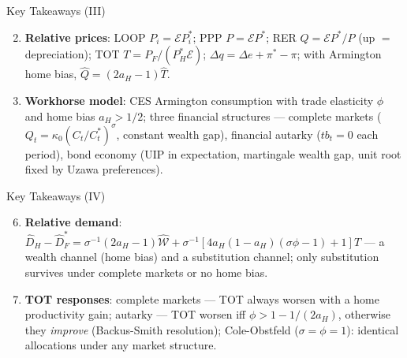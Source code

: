 \documentclass[blue]{beamer}
\begin{document}
\begin{frame}{Key Takeaways (III) }
\begin{enumerate}
    \setcounter{enumi}{1}
    \item \textbf{Relative prices}: LOOP $P_i = \mathcal{E}P_i^*$; PPP $P = \mathcal{E}P^*$; RER $Q = \mathcal{E}P^*/P$ (up $=$ depreciation); TOT $T = P_F/(P_H^*\mathcal{E})$; $\Delta q = \Delta e + \pi^* - \pi$; with Armington home bias, $\hat{Q} = (2a_H - 1)\hat{T}$.

    \item \textbf{Workhorse model}: CES Armington consumption with trade elasticity $\phi$ and home bias $a_H > 1/2$; three financial structures --- complete markets ($Q_t = \kappa_0(C_t/C_t^*)^{\sigma}$, constant wealth gap), financial autarky ($tb_t = 0$ each period), bond economy (UIP in expectation, martingale wealth gap, unit root fixed by Uzawa preferences).
\end{enumerate}
\end{frame}

\begin{frame}{Key Takeaways (IV)}
\small
\begin{enumerate}
    \setcounter{enumi}{5}
    \item \textbf{Relative demand}: $\hat{D}_H - \hat{D}_F^* = \sigma^{-1}(2a_H-1)\hat{\mathcal{W}} + \sigma^{-1}[4a_H(1-a_H)(\sigma\phi - 1) + 1]\hat{T}$ --- a wealth channel (home bias) and a substitution channel; only substitution survives under complete markets or no home bias.

    \item \textbf{TOT responses}: complete markets --- TOT always worsen with a home productivity gain; autarky --- TOT worsen iff $\phi > 1 - 1/(2a_H)$, otherwise they \emph{improve} (Backus-Smith resolution); Cole-Obstfeld ($\sigma = \phi = 1$): identical allocations under any market structure.

\end{enumerate}
\end{frame}
\end{document}
